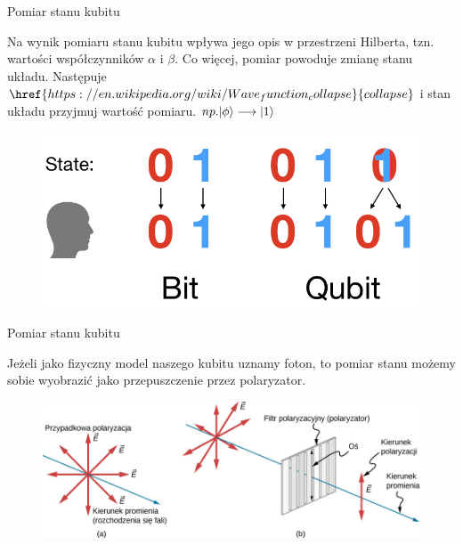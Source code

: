 \documentclass{beamer}
\DeclarePairedDelimiter\ket{\lvert}{\rangle}
\begin{document}
	\begin{frame}{Pomiar stanu kubitu}
		\begin{block}{}
			\vspace{0.5em}
			Na wynik pomiaru stanu kubitu wpływa jego opis w przestrzeni Hilberta, tzn. wartości współczynników $\alpha$ i $\beta$.
			Co więcej, pomiar powoduje zmianę stanu układu. Następuje $\href{https://en.wikipedia.org/wiki/Wave_function_collapse}{collapse}$ i stan układu przyjmuj wartość pomiaru. $np. \ket{\phi} \longrightarrow \ket{1}$
			\vspace{0.5em}
		\end{block}
		
		\vspace{0.5em}
		\begin{center}
			\begin{figure}
				\includegraphics[scale=0.25]{media/collapse.jpg}
			\end{figure}
		\end{center}
		\vspace{0.5em}
	\end{frame}

	\begin{frame}{Pomiar stanu kubitu}
			\begin{block}{}
			\vspace{0.5em}
			Jeżeli jako fizyczny model naszego kubitu uznamy foton, to pomiar stanu możemy sobie wyobrazić jako przepuszczenie przez polaryzator.
			\vspace{0.5em}
		\end{block}
	
		\begin{figure}
			\includegraphics[scale=0.33]{media/foton_pomiar.png}
		\end{figure}
	\end{frame}
	
\end{document}
